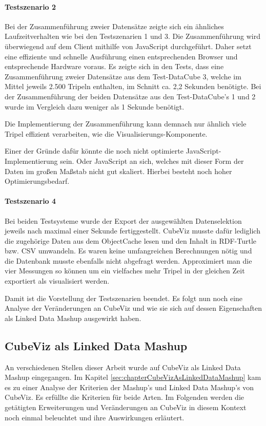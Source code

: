 \documentclass[11pt]{article}
\newcommand{\com}[1]{\marginpar{\em {\small{#1}}}} %
\begin{document}
\paragraph{Testszenario 2} Bei der Zusammenführung zweier Datensätze zeigte sich ein ähnliches Laufzeitverhalten wie bei den Testszenarien 1 und 3. Die Zusammenführung wird überwiegend auf dem Client mithilfe von JavaScript durchgeführt. Daher setzt eine effiziente und schnelle Ausführung einen entsprechenden Browser und entsprechende Hardware voraus. Es zeigte sich in den Tests, dass eine Zusammenführung zweier Datensätze aus dem Test-DataCube 3, welche im Mittel jeweils 2.500 Tripeln enthalten, im Schnitt ca. 2,2 Sekunden benötigte. Bei der Zusammenführung der beiden Datensätze aus den Test-DataCube's 1 und 2 wurde im Vergleich dazu weniger als 1 Sekunde benötigt.

Die Implementierung der Zusammenführung kann demnach nur ähnlich viele Tripel effizient verarbeiten, wie die Visualisierungs-Komponente.

\newpage
\noindent
Einer der Gründe dafür könnte die noch nicht optimierte JavaScript-Implementierung sein. Oder JavaScript an sich, welches mit dieser Form der Daten im großen Maßstab nicht gut skaliert. Hierbei besteht noch hoher Optimierungsbedarf.


\paragraph{Testszenario 4} Bei beiden Testsysteme wurde der Export der ausgewählten Datenselektion jeweils nach maximal einer Sekunde fertiggestellt. CubeViz musste dafür lediglich die zugehörige Daten aus dem ObjectCache lesen und den Inhalt in RDF-Turtle bzw. CSV umwandeln. Es waren keine umfangreichen Berechnungen nötig und die Datenbank musste ebenfalls nicht abgefragt werden. Approximiert man die vier Messungen so können um ein vielfaches mehr Tripel in der gleichen Zeit exportiert als visualisiert werden. 

Damit ist die Vorstellung der Testszenarien beendet. Es folgt nun noch eine Analyse der Veränderungen an CubeViz und wie sie sich auf dessen Eigenschaften als Linked Data Mashup ausgewirkt haben.

%
%
\subsection{CubeViz als Linked Data Mashup}

An verschiedenen Stellen dieser Arbeit wurde auf CubeViz als Linked Data Mashup eingegangen. Im Kapitel \ref{sec:chapterCubeVizAsLinkedDataMashup}\com{Kapitel \ref{sec:chapterCubeVizAsLinkedDataMashup} \\ S. \pageref{sec:chapterCubeVizAsLinkedDataMashup}} kam es zu einer Analyse der Kriterien der Mashup's und Linked Data Mashup's von CubeViz. Es erfüllte die Kriterien für beide Arten. Im Folgenden werden die getätigten Erweiterungen und Veränderungen an CubeViz in diesem Kontext noch einmal beleuchtet und ihre Auswirkungen erläutert.
\end{document}
